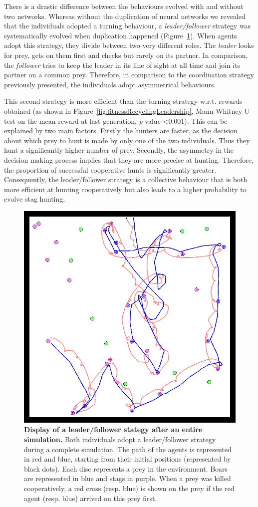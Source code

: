     There is a drastic difference between the behaviours evolved with and without two networks. Whereas without the duplication of neural networks we revealed that the individuals adopted a turning behaviour, a \emph{leader/follower} strategy was systematically evolved when duplication happened (Figure~\ref{fig:figLeadershipBehaviour}). When agents adopt this strategy, they divide between two very different roles. The \emph{leader} looks for prey, gets on them first and checks but rarely on its partner. In comparison, the \emph{follower} tries to keep the leader in its line of sight at all time and join its partner on a common prey. Therefore, in comparison to the coordination strategy previously presented, the individuals adopt asymmetrical behaviours. 

    This second strategy is more efficient than the turning strategy w.r.t. rewards obtained (as shown in Figure~\ref{fig:fitnessRecyclingLeadership}, Mann-Whitney U test on the mean reward at last generation, {\em p}-value \textless 0.001). This can be explained by two main factors. Firstly the hunters are faster, as the decision about which prey to hunt is made by only one of the two individuals. Thus they hunt a significantly higher number of prey. Secondly, the asymmetry in the decision making process implies that they are more precise at hunting. Therefore, the proportion of successful cooperative hunts is significantly greater. Consequently, the leader/follower strategy is a collective behaviour that is both more efficient at hunting cooperatively but also leads to a higher probability to evolve stag hunting.

    \begin{figure}[h]
      \centering
        \includegraphics[width=0.5\linewidth]{fig/ArticleBio2/Fig5.png}
        \caption{\textbf{Display of a leader/follower stategy after an entire simulation.}
        Both individuals adopt a leader/follower strategy during a complete simulation. The path of the agents is represented in red and blue, starting from their initial positions (represented by black dots). Each disc represents a prey in the environment. Boars are represented in blue and stags in purple. When a prey was killed cooperatively, a red cross (resp. blue) is shown on the prey if the red agent (resp. blue) arrived on this prey first.}
      \label{fig:figLeadershipBehaviour}
    \end{figure}

